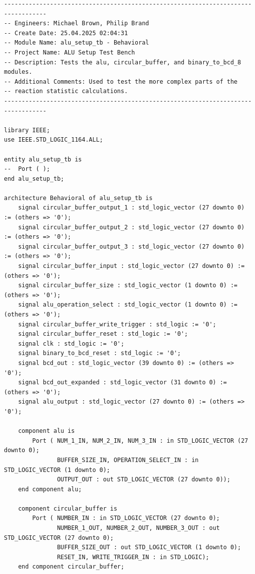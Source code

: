 \documentclass[11pt]{article}
\newenvironment{code}{\captionsetup{type=listing}}{}
\begin{document}
\vspace*{1cm}
\begin{code}
  \begin{verbatim}
----------------------------------------------------------------------------------
-- Engineers: Michael Brown, Philip Brand
-- Create Date: 25.04.2025 02:04:31
-- Module Name: alu_setup_tb - Behavioral
-- Project Name: ALU Setup Test Bench 
-- Description: Tests the alu, circular_buffer, and binary_to_bcd_8 modules.
-- Additional Comments: Used to test the more complex parts of the 
-- reaction statistic calculations.
----------------------------------------------------------------------------------

library IEEE;
use IEEE.STD_LOGIC_1164.ALL;

entity alu_setup_tb is
--  Port ( );
end alu_setup_tb;

architecture Behavioral of alu_setup_tb is
    signal circular_buffer_output_1 : std_logic_vector (27 downto 0) := (others => '0');
    signal circular_buffer_output_2 : std_logic_vector (27 downto 0) := (others => '0');
    signal circular_buffer_output_3 : std_logic_vector (27 downto 0) := (others => '0');
    signal circular_buffer_input : std_logic_vector (27 downto 0) := (others => '0');
    signal circular_buffer_size : std_logic_vector (1 downto 0) := (others => '0');
    signal alu_operation_select : std_logic_vector (1 downto 0) := (others => '0');
    signal circular_buffer_write_trigger : std_logic := '0';
    signal circular_buffer_reset : std_logic := '0';
    signal clk : std_logic := '0';
    signal binary_to_bcd_reset : std_logic := '0';
    signal bcd_out : std_logic_vector (39 downto 0) := (others => '0');
    signal bcd_out_expanded : std_logic_vector (31 downto 0) := (others => '0');
    signal alu_output : std_logic_vector (27 downto 0) := (others => '0');
    
    component alu is
        Port ( NUM_1_IN, NUM_2_IN, NUM_3_IN : in STD_LOGIC_VECTOR (27 downto 0);
               BUFFER_SIZE_IN, OPERATION_SELECT_IN : in STD_LOGIC_VECTOR (1 downto 0);
               OUTPUT_OUT : out STD_LOGIC_VECTOR (27 downto 0));
    end component alu;

    component circular_buffer is
        Port ( NUMBER_IN : in STD_LOGIC_VECTOR (27 downto 0);
               NUMBER_1_OUT, NUMBER_2_OUT, NUMBER_3_OUT : out STD_LOGIC_VECTOR (27 downto 0);
               BUFFER_SIZE_OUT : out STD_LOGIC_VECTOR (1 downto 0);
               RESET_IN, WRITE_TRIGGER_IN : in STD_LOGIC);
    end component circular_buffer;


\end{verbatim}
\end{code}
\end{document}
